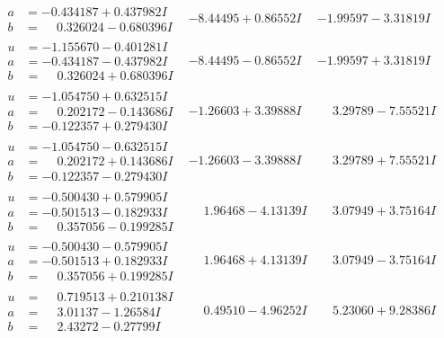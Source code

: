 \documentclass[1p]{elsarticle_modified}
\theoremstyle{definition}
\begin{document}
$$\begin{array}{c|c|c}
\begin{aligned}
a &= -0.434187 + 0.437982 I \\
b &= \phantom{-}0.326024 - 0.680396 I\end{aligned}
 & -8.44495 + 0.86552 I & -1.99597 - 3.31819 I \\ \hline\begin{aligned}
u &= -1.155670 - 0.401281 I \\
a &= -0.434187 - 0.437982 I \\
b &= \phantom{-}0.326024 + 0.680396 I\end{aligned}
 & -8.44495 - 0.86552 I & -1.99597 + 3.31819 I \\ \hline\begin{aligned}
u &= -1.054750 + 0.632515 I \\
a &= \phantom{-}0.202172 - 0.143686 I \\
b &= -0.122357 + 0.279430 I\end{aligned}
 & -1.26603 + 3.39888 I & \phantom{-}3.29789 - 7.55521 I \\ \hline\begin{aligned}
u &= -1.054750 - 0.632515 I \\
a &= \phantom{-}0.202172 + 0.143686 I \\
b &= -0.122357 - 0.279430 I\end{aligned}
 & -1.26603 - 3.39888 I & \phantom{-}3.29789 + 7.55521 I \\ \hline\begin{aligned}
u &= -0.500430 + 0.579905 I \\
a &= -0.501513 - 0.182933 I \\
b &= \phantom{-}0.357056 - 0.199285 I\end{aligned}
 & \phantom{-}1.96468 - 4.13139 I & \phantom{-}3.07949 + 3.75164 I \\ \hline\begin{aligned}
u &= -0.500430 - 0.579905 I \\
a &= -0.501513 + 0.182933 I \\
b &= \phantom{-}0.357056 + 0.199285 I\end{aligned}
 & \phantom{-}1.96468 + 4.13139 I & \phantom{-}3.07949 - 3.75164 I \\ \hline\begin{aligned}
u &= \phantom{-}0.719513 + 0.210138 I \\
a &= \phantom{-}3.01137 - 1.26584 I \\
b &= \phantom{-}2.43272 - 0.27799 I\end{aligned}
 & \phantom{-}0.49510 - 4.96252 I & \phantom{-}5.23060 + 9.28386 I \\ \hline\begin{aligned}

\end{aligned}
\end{array}$$
\end{document}
